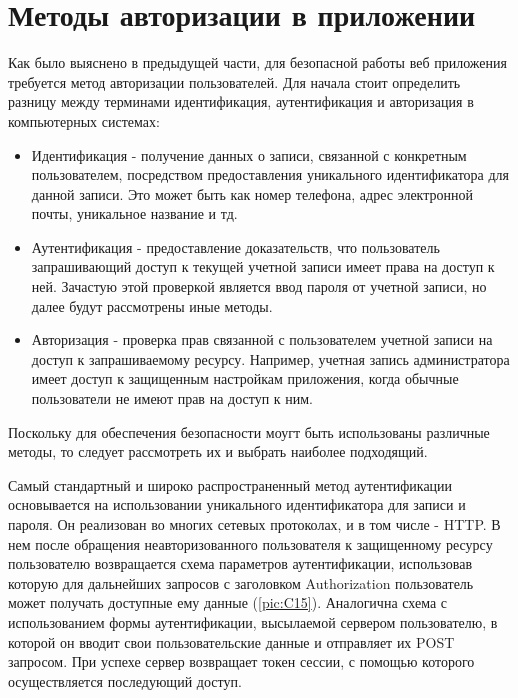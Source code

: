 \section{Методы авторизации в приложении}

Как было выяснено в предыдущей части, для безопасной работы веб приложения требуется метод авторизации пользователей. Для начала стоит определить разницу между терминами идентификация, аутентификация и авторизация в компьютерных системах:

\begin{itemize}

\item Идентификация - получение данных о записи, связанной с конкретным пользователем, посредством предоставления уникального идентификатора для данной записи. Это может быть как номер телефона, адрес электронной почты, уникальное название и тд.

\item Аутентификация - предоставление доказательств, что пользователь запрашивающий доступ к текущей учетной записи имеет права на доступ к ней. Зачастую этой проверкой является ввод пароля от учетной записи, но далее будут рассмотрены иные методы.

\item Авторизация - проверка прав связанной с пользователем учетной записи на доступ к запрашиваемому ресурсу. Например, учетная запись администратора имеет доступ к защищенным настройкам приложения, когда обычные пользователи не имеют прав на доступ к ним.

\end{itemize}

Поскольку для обеспечения безопасности моугт быть использованы различные методы, то следует рассмотреть их и выбрать наиболее подходящий.

Самый стандартный и широко распространенный метод аутентификации основывается на использовании уникального идентификатора для записи и пароля. Он реализован во многих сетевых протоколах, и в том числе - HTTP. В нем после обращения неавторизованного пользователя к защищенному ресурсу пользователю возвращается схема параметров аутентификации, использовав которую для дальнейших запросов с заголовком Authorization пользователь может получать доступные ему данные (\ref{pic:C15}). Аналогична схема с использованием формы аутентификации, высылаемой сервером пользователю, в которой он вводит свои пользовательские данные и отправляет их POST запросом. При успехе сервер возвращает токен сессии, с помощью которого осуществляется последующий доступ.

